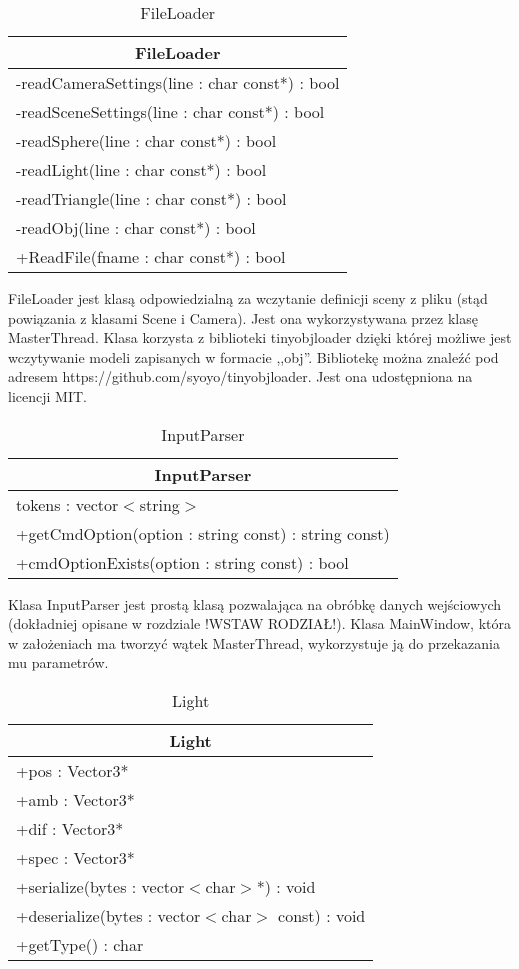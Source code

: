 \begin{longtable}{|p{16cm}|}
    \caption{FileLoader} \label{tab:FileLoader} \\ \hline
    \multicolumn{1}{|c|}{FileLoader} \\ \hline
    -readCameraSettings(line : char const*) : bool \\
    -readSceneSettings(line : char const*) : bool \\
    -readSphere(line : char const*) : bool \\
    -readLight(line : char const*) : bool \\
    -readTriangle(line : char const*) : bool \\
    -readObj(line : char const*) : bool \\
	+ReadFile(fname : char const*) : bool \\ \hline
\end{longtable}

FileLoader jest klasą odpowiedzialną za wczytanie definicji sceny z pliku (stąd powiązania z klasami Scene i Camera). Jest ona wykorzystywana przez klasę MasterThread. Klasa korzysta z biblioteki tinyobjloader dzięki której możliwe jest wczytywanie modeli zapisanych w formacie ,,obj''. Bibliotekę można znaleźć pod adresem https://github.com/syoyo/tinyobjloader. Jest ona udostępniona na licencji MIT.

\begin{longtable}{|p{16cm}|}
    \caption{InputParser} \label{tab:InputParser} \\ \hline
    \multicolumn{1}{|c|}{InputParser} \\ \hline
    tokens : vector$<$string$>$  \\ \hline
    +getCmdOption(option : string const) : string const) \\
    +cmdOptionExists(option : string const) : bool \\ \hline
\end{longtable}

Klasa InputParser jest prostą klasą pozwalająca na obróbkę danych wejściowych (dokładniej opisane w rozdziale !WSTAW RODZIAŁ!). Klasa MainWindow, która w założeniach ma tworzyć wątek MasterThread, wykorzystuje ją do przekazania mu parametrów.

\begin{longtable}{|p{16cm}|}
    \caption{Light} \label{tab:Light} \\ \hline
    \multicolumn{1}{|c|}{Light} \\ \hline
    +pos : Vector3* \\ 
    +amb : Vector3* \\
    +dif : Vector3* \\
    +spec : Vector3* \\
    \hline
	+serialize(bytes : vector$<$char$>$*) : void \\ 
	+deserialize(bytes : vector$<$char$>$ const) : void \\
	+getType() : char \\
	\hline
\end{longtable}

